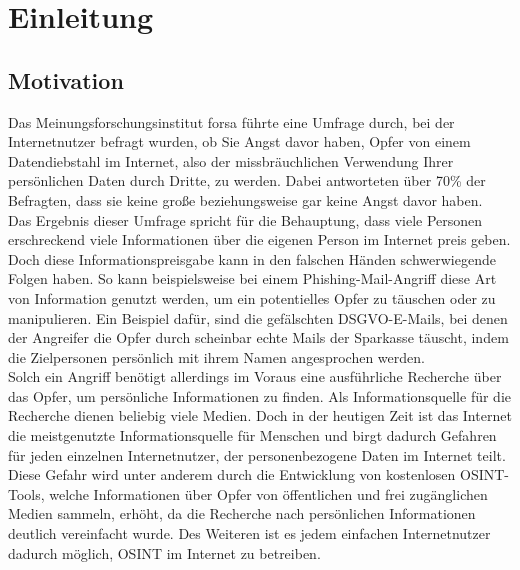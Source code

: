 \chapter{Einleitung}
\label{cha:einleitung}

\section{Motivation}
Das Meinungsforschungsinstitut forsa führte eine Umfrage durch, bei der Internetnutzer befragt wurden, ob Sie Angst davor haben, Opfer von einem Datendiebstahl im Internet, also der missbräuchlichen Verwendung Ihrer persönlichen Daten durch Dritte, zu werden. Dabei antworteten über 70\% der Befragten, dass sie keine große beziehungsweise gar keine Angst davor haben. \cite{AngstDatendiebstahl}\\
Das Ergebnis dieser Umfrage spricht für die Behauptung, dass viele Personen erschreckend viele Informationen über die eigenen Person im Internet preis geben. Doch diese Informationspreisgabe kann in den falschen Händen schwerwiegende Folgen haben. So kann beispielsweise bei einem Phishing-Mail-Angriff diese Art von Information genutzt werden, um ein potentielles Opfer zu täuschen oder zu manipulieren. 
Ein Beispiel dafür, sind die gefälschten DSGVO-E-Mails, bei denen der Angreifer die Opfer durch scheinbar echte Mails der Sparkasse täuscht, indem die Zielpersonen persönlich mit ihrem Namen angesprochen werden. \cite{VerbraucherzentraleNW}
\\
Solch ein Angriff benötigt allerdings im Voraus eine ausführliche Recherche über das Opfer, um persönliche Informationen zu finden. Als Informationsquelle für die Recherche dienen beliebig viele Medien. Doch in der heutigen Zeit ist das Internet die meistgenutzte Informationsquelle für Menschen und birgt dadurch Gefahren für jeden einzelnen Internetnutzer, der personenbezogene Daten im Internet teilt. \cite{Inforamtionsquellen} Diese Gefahr wird unter anderem durch die Entwicklung von kostenlosen OSINT-Tools, welche Informationen über Opfer von öffentlichen und frei zugänglichen Medien sammeln, erhöht, da die Recherche nach persönlichen Informationen deutlich vereinfacht wurde. Des Weiteren ist es jedem einfachen Internetnutzer dadurch möglich, OSINT im Internet zu betreiben.


